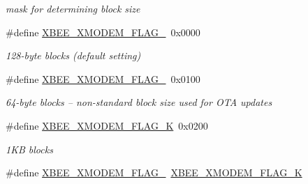 \begin{DoxyCompactItemize}
\begin{DoxyCompactList}\small\item\em mask for determining block size \end{DoxyCompactList}\item 
\hypertarget{group__util__xmodem_ga46eeab5e2a5ef0efbdb5f0706fa9f26c}{\#define \hyperlink{group__util__xmodem_ga46eeab5e2a5ef0efbdb5f0706fa9f26c}{X\-B\-E\-E\-\_\-\-X\-M\-O\-D\-E\-M\-\_\-\-F\-L\-A\-G\-\_}~0x0000}\label{group__util__xmodem_ga46eeab5e2a5ef0efbdb5f0706fa9f26c}

\begin{DoxyCompactList}\small\item\em 128-\/byte blocks (default setting) \end{DoxyCompactList}\item 
\hypertarget{group__util__xmodem_ga9c55ba56c6cba75308ee8b0b8594a6c4}{\#define \hyperlink{group__util__xmodem_ga9c55ba56c6cba75308ee8b0b8594a6c4}{X\-B\-E\-E\-\_\-\-X\-M\-O\-D\-E\-M\-\_\-\-F\-L\-A\-G\-\_}~0x0100}\label{group__util__xmodem_ga9c55ba56c6cba75308ee8b0b8594a6c4}

\begin{DoxyCompactList}\small\item\em 64-\/byte blocks -- non-\/standard block size used for O\-T\-A updates \end{DoxyCompactList}\item 
\hypertarget{group__util__xmodem_ga2a13979799d1a7ef697025608545f995}{\#define \hyperlink{group__util__xmodem_ga2a13979799d1a7ef697025608545f995}{X\-B\-E\-E\-\_\-\-X\-M\-O\-D\-E\-M\-\_\-\-F\-L\-A\-G\-\_\-K}~0x0200}\label{group__util__xmodem_ga2a13979799d1a7ef697025608545f995}

\begin{DoxyCompactList}\small\item\em 1\-K\-B blocks \end{DoxyCompactList}\item 
\hypertarget{group__util__xmodem_ga177f2ec8f42b568c7f461f729f00bf2b}{\#define \hyperlink{group__util__xmodem_ga177f2ec8f42b568c7f461f729f00bf2b}{X\-B\-E\-E\-\_\-\-X\-M\-O\-D\-E\-M\-\_\-\-F\-L\-A\-G\-\_}~\hyperlink{group__util__xmodem_ga2a13979799d1a7ef697025608545f995}{X\-B\-E\-E\-\_\-\-X\-M\-O\-D\-E\-M\-\_\-\-F\-L\-A\-G\-\_\-K}}\label{group__util__xmodem_ga177f2ec8f42b568c7f461f729f00bf2b}


\end{DoxyCompactItemize}
